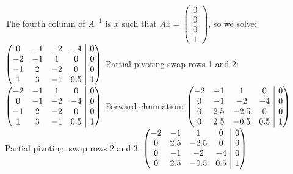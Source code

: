 \documentclass[11pt]{article}
\makeatletter
\newenvironment{amatrix}[1]{%
  \left(\begin{array}{@{}*{#1}{c}|c@{}}
}{%
  \end{array}\right)
}
\makeatother
\begin{document}
\renewcommand{\thesubsection}{\thesection.\alph{subsection}}
\section{} %
\subsection{} %
The fourth column of $A^{-1}$ is $x$ such that
$Ax=\left(\begin{smallmatrix}0\\0\\0\\1\end{smallmatrix}\right)$, so we solve:\\
$\begin{amatrix}{4}
	0 & -1 & -2 & -4 & 0\\
	-2 & -1 & 1 & 0 & 0\\
	-1 & 2 & -2 & 0 & 0\\
	1 & 3 & -1 & 0.5 & 1
\end{amatrix}$
\newline
\newline
Partial pivoting swap rows 1 and 2:
$\begin{amatrix}{4}
	-2 & -1 & 1 & 0 & 0\\
	0 & -1 & -2 & -4 & 0\\
	-1 & 2 & -2 & 0 & 0\\
	1 & 3 & -1 & 0.5 & 1
\end{amatrix}$
\newline
\newline
Forward elminiation:
$\begin{amatrix}{4}
	-2 & -1 & 1 & 0 & 0\\
	0 & -1 & -2 & -4 & 0\\
	0 & 2.5 & -2.5 & 0 & 0\\
	0 & 2.5 & -0.5 & 0.5 & 1
\end{amatrix}$
\newline
\newline
Partial pivoting: swap rows 2 and 3:
$\begin{amatrix}{4}
	-2 & -1 & 1 & 0 & 0\\
	0 & 2.5 & -2.5 & 0 & 0\\
	0 & -1 & -2 & -4 & 0\\
	0 & 2.5 & -0.5 & 0.5 & 1
\end{amatrix}$
\newline
\newline
\end{document}
